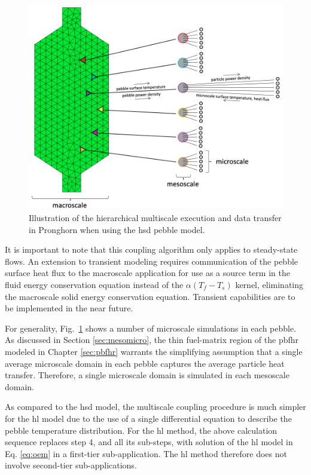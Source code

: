 \begin{figure}[!h]
\centering
\includegraphics[width=0.8\linewidth]{figs/multiscale_pbr_d.png}
\caption{Illustration of the hierarchical multiscale execution and data transfer in Pronghorn when using the \gls{hsd} pebble model.}
\label{fig:multiscale_pbr}
\end{figure}

It is important to note that this coupling algorithm only applies to steady-state flows. An extension to transient modeling requires communication of the pebble surface heat flux to the macroscale application for use as a source term in the fluid energy conservation equation instead of the \(\alpha(T_f-T_s)\) kernel, eliminating the macroscale solid energy conservation equation. Transient capabilities are to be implemented in the near future. 

For generality, Fig.\ \ref{fig:multiscale_pbr} shows a number of microscale simulations in each pebble. As discussed in Section \ref{sec:mesomicro}, the thin fuel-matrix region of the \gls{pbfhr} modeled in Chapter \ref{sec:pbfhr} warrants the simplifying assumption that a single average microscale domain in each pebble captures the average particle heat transfer. Therefore, a single microscale domain is simulated in each mesoscale domain.

As compared to the \gls{hsd} model, the multiscale coupling procedure is much simpler for the \gls{hl} model due to the use of a single differential equation to describe the pebble temperature distribution. For the \gls{hl} method, the above calculation sequence replaces step 4, and all its sub-steps, with solution of the \gls{hl} model in Eq. \eqref{eq:oem} in a first-tier sub-application. The \gls{hl} method therefore does not involve second-tier sub-applications. 

